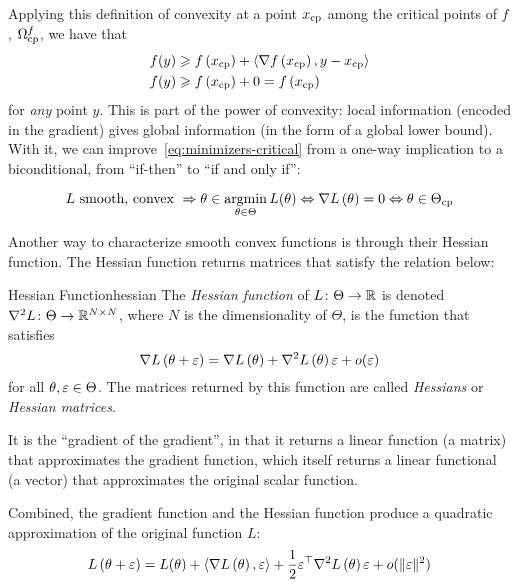 \documentclass[../../thesis.tex]{subfiles}
\begin{document}
Applying this definition of convexity at a point $x_{\mathrm{cp}}$
among the critical points of $f$, $\Omega^f_{\mathrm{cp}}$,
we have that
\begin{align}
	f(y) &\geqslant f\left(x_{\mathrm{cp}}\right) + \langle\nabla f\left(x_{\mathrm{cp}}\right), y - x_{\mathrm{cp}} \rangle\\
	f(y) &\geqslant f\left(x_{\mathrm{cp}}\right) + 0 = f\left(x_{\mathrm{cp}}\right)
\end{align}
for \emph{any} point $y$.
This is part of the power of convexity:
local information (encoded in the gradient)
gives global information (in the form of a global lower bound).
With it, we can improve~\ref{eq:minimizers-critical}
from a one-way implication to a biconditional,
from \enquote{if-then} to
\enquote{if and only if}:

\begin{equation}\equationlabel{convexity-critical}
	L \text{\ smooth, convex\ } \Rightarrow\\
	\theta \in \argmin_{\theta \in \Theta} L(\theta)
	\Leftrightarrow \grad{L}{\theta} = 0
	\Leftrightarrow \theta \in \Theta_{\cp}
\end{equation}

Another way to characterize smooth convex functions is through their Hessian function.
The Hessian function returns matrices that satisfy the relation below:
\begin{definition}{Hessian Function}{hessian}
	The \emph{Hessian function} of $L \colon \Theta \to \mathbb{R}$
	is denoted $\nabla^2{L} \colon \Theta \to \mathbb{R}^{N\times N}$,
	where $N$ is the dimensionality of $\Theta$,
	is the function that satisfies
	\begin{equation}\equationlabel{def-hessian}
		\grad{L}{\theta + \eps} = \grad{L}{\theta} + \hess{L}{\theta}\eps + o(\eps)
	\end{equation}
	for all $\theta, \varepsilon \in \Theta$.
	The matrices returned by this function are called \emph{Hessians}
	or \emph{Hessian matrices}.
\end{definition}
It is the \enquote{gradient of the gradient},
in that it returns a linear function (a matrix)
that approximates the gradient function,
which itself returns a linear functional (a vector)
that approximates the original scalar function.

Combined, the gradient function and the Hessian function produce a quadratic approximation
of the original function $L$:
\begin{equation}\equationlabel{taylor-two}
	L\left(\theta + \eps\right) =
	L(\theta)
	+ \langle\grad{L}{\theta},\eps\rangle
	+ \frac{1}{2}\eps^\top\hess{L}{\theta}\eps + o(\snorm{\eps})
\end{equation}
\end{document}
